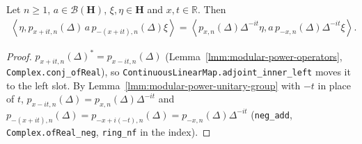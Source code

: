 \begin{lemma}
    \label{lmm:van-daele-strip-function-shift}
    \leanok
    Let $n \ge 1$, $a \in \mathcal{B}(\mathbf{H})$, $\xi, \eta \in \mathbf{H}$ and $x, t \in \mathbb{R}$. Then
    \begin{align}
        \left< \eta, p_{x+it,n}(\Delta)\,a\,p_{-(x+it),n}(\Delta)\xi \right> = \left< p_{x,n}(\Delta)\Delta^{-it}\eta, a\,p_{-x,n}(\Delta)\Delta^{-it}\xi \right>.
    \end{align}
\end{lemma}
\begin{proof}
    \leanok
    $p_{x+it,n}(\Delta)^* = p_{x-it,n}(\Delta)$ (Lemma~\ref{lmm:modular-power-operators}, \texttt{Complex.conj\_ofReal}), so \texttt{ContinuousLinearMap.adjoint\_inner\_left} moves it to the left slot. By Lemma~\ref{lmm:modular-power-unitary-group} with $-t$ in place of $t$, $p_{x-it,n}(\Delta) = p_{x,n}(\Delta)\Delta^{-it}$ and $p_{-(x+it),n}(\Delta) = p_{-x+i(-t),n}(\Delta) = p_{-x,n}(\Delta)\Delta^{-it}$ (\texttt{neg\_add}, \texttt{Complex.ofReal\_neg}, \texttt{ring\_nf} in the index).
\end{proof}

